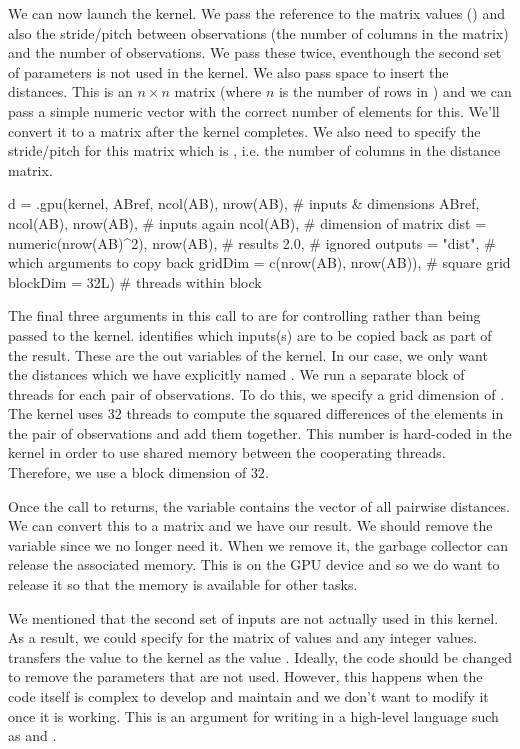 We can now launch the kernel. We pass the reference
to the matrix values () and also
the stride/pitch between observations (the number of columns in 
the matrix) and the number of observations.
We pass these twice, eventhough the second set of parameters is not
used in the kernel.
We also pass space to insert the distances. This is an $n \times n$
matrix  (where $n$ is the number of rows in )
and we can pass a simple numeric vector with the correct number of
elements for this.  We'll convert it to a matrix after the kernel
completes.
We also need to specify the stride/pitch for this matrix which is
, i.e. the number of columns in the distance matrix.
\begin{RCode}
d = .gpu(kernel,
         ABref, ncol(AB), nrow(AB),            # inputs & dimensions
         ABref, ncol(AB), nrow(AB),            # inputs again
         ncol(AB),                             # dimension of matrix
         dist = numeric(nrow(AB)^2), nrow(AB), # results
         2.0,                                  # ignored
         outputs = "dist",                # which arguments to copy back
         gridDim = c(nrow(AB), nrow(AB)), # square grid
         blockDim = 32L)                  # threads within block
\end{RCode}
The final three arguments in this call to  are for
controlling  rather than being passed to the kernel.
 identifies which inputs(s) are to be copied back as part
of the result. These are the out variables of the kernel.
In our case, we only want the distances which we have explicitly named
.
We run a separate block of threads for each pair of observations.
To do this, we specify a grid dimension of .
The kernel uses $32$ threads to compute the squared differences of the
elements in the pair of observations and add them together.
This number is hard-coded in the kernel in order to use shared memory
between the cooperating threads.
Therefore, we use a block dimension of $32$.

Once the call to  returns, the variable  contains
the vector of all pairwise distances.  We can convert this to a matrix
and we have our result.  We should remove the variable 
since we no longer need it. When we remove it, the garbage collector
can release the associated memory. This is on the GPU device and so we
do want to release it so that the memory is available for other tasks.

We mentioned that the second set of inputs are not actually used in
this kernel. As a result, we could specify \Rnull{} for the matrix
of values and any integer values.   transfers the \R{}
value to the kernel as the \C{} value \Cnull.
Ideally, the code should be changed to remove the parameters that are
not used. However, this happens when the code itself is complex to
develop and maintain and we don't want to modify it once it is working.
This is an argument for writing in a high-level
language such as \R{} and .


